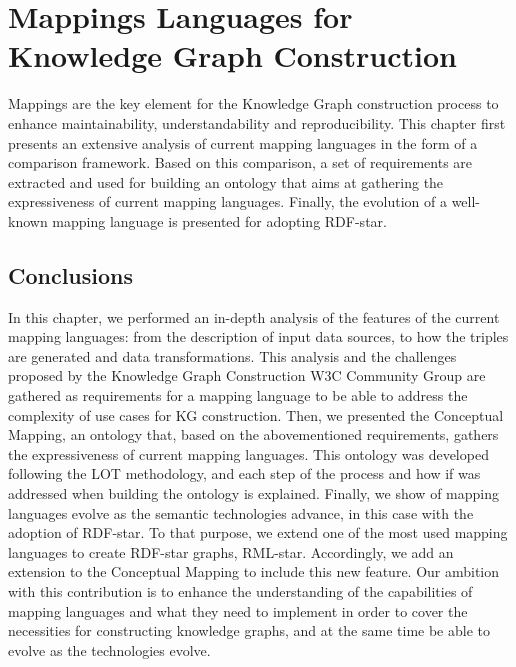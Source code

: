 
\chapter{Mappings Languages for Knowledge Graph Construction}
\label{chapter:mappings}

Mappings are the key element for the Knowledge Graph construction process to enhance maintainability, understandability and reproducibility. This chapter first presents an extensive analysis of current mapping languages in the form of a comparison framework. Based on this comparison, a set of requirements are extracted and used for building an ontology that aims at gathering the expressiveness of current mapping languages. Finally, the evolution of a well-known mapping language is presented for adopting RDF-star.








\section{Conclusions}

In this chapter, we performed an in-depth analysis of the features of the current mapping languages: from the description of input data sources, to how the triples are generated and data transformations. This analysis and the challenges proposed by the Knowledge Graph Construction W3C Community Group are gathered as requirements for a mapping language to be able to address the complexity of use cases for KG construction. Then, we presented the Conceptual Mapping, an ontology that, based on the abovementioned requirements, gathers the expressiveness of current mapping languages. This ontology was developed following the LOT methodology, and each step of the process and how if was addressed when building the ontology is explained. Finally, we show of mapping languages evolve as the semantic technologies advance, in this case with the adoption of RDF-star. To that purpose, we extend one of the most used mapping languages to create RDF-star graphs, RML-star. Accordingly, we add an extension to the Conceptual Mapping to include this new feature. Our ambition with this contribution is to enhance the understanding of the capabilities of mapping languages and what they need to implement in order to cover the necessities for constructing knowledge graphs, and at the same time be able to evolve as the technologies evolve.